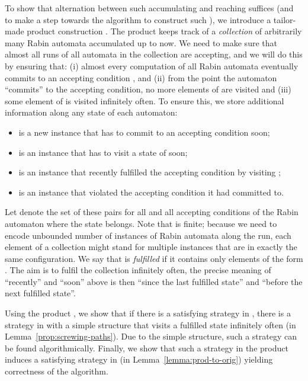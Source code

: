 \documentclass[a4paper,UKenglish]{lipics}
\begin{document}
To show that alternation between such accumulating and reaching suffices (and to make a step towards the algorithm to construct such ), we introduce a tailor-made product construction . The product keeps track of a \emph{collection} of arbitrarily many Rabin automata accumulated up to now. 
We need to make sure that almost all runs of all automata in the collection are accepting, and we will do this by ensuring that:
(i) almost every computation of all Rabin automata eventually commits to an accepting condition , and (ii) from the point the automaton
``commits'' to the accepting condition, no more elements of  are visited and (iii) some element of  is visited infinitely often.
To ensure this, we store additional information along any state  of each automaton:
\begin{itemize}
	\item  is a new instance that has to commit to an accepting condition soon;
	\item  is an instance that has to visit a state of  soon;
	\item  is an instance that recently fulfilled the accepting condition by visiting ;
	\item  is an instance that violated the accepting condition it had committed to.
\end{itemize}

\noindent
Let  denote the set of these pairs for all  and all accepting conditions  of the Rabin automaton where the state  belongs.
Note that  is finite; because we need to encode unbounded number of instances of Rabin automata along the run, each element of a collection  might stand for multiple instances that are in exactly the same configuration.
We say that  is {\em fulfilled} if it contains only elements of the form 
.
The aim is to fulfil the collection infinitely often, the precise meaning of ``recently'' and ``soon'' above is then ``since the last fulfilled state'' and ``before the next fulfilled state''. 

Using the product , we show that if there is a satisfying strategy in , there is a  strategy in  with a simple structure that visits a fulfilled state infinitely often (in Lemma~\ref{prop:screwing-paths}). Due to the simple structure, such a strategy can be found algorithmically. Finally, we show that such a strategy in the product induces a satisfying strategy in  (in Lemma~\ref{lemma:prod-to-orig}) yielding correctness of the algorithm.
\end{document}
